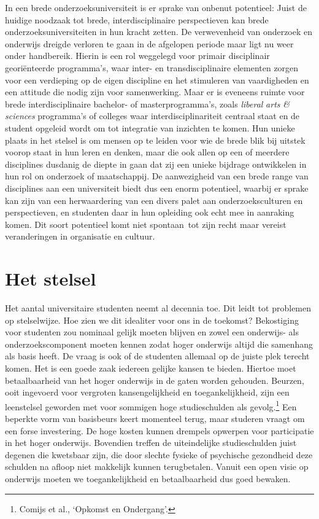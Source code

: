 \documentclass[smallauthor, chapterhaspagenum, nochapterinheader, pagenuminheader,  bigchapnum,medium2, tocpages, garamond, titleinheader]{jote-book}
\begin{document}
	In een brede onderzoeksuniversiteit is er sprake van onbenut potentieel: Juist de huidige noodzaak tot brede, interdisciplinaire perspectieven kan brede onderzoeksuniversiteiten in hun kracht zetten. De verwevenheid van onderzoek en onderwijs dreigde verloren te gaan in de afgelopen periode maar ligt nu weer onder handbereik. Hierin is een rol weggelegd voor primair disciplinair georiënteerde programma's, waar inter- en transdisciplinaire elementen zorgen voor een verdieping op de eigen discipline en het stimuleren van vaardigheden en een attitude die nodig zijn voor samenwerking. Maar er is eveneens ruimte voor brede interdisciplinaire bachelor- of masterprogramma's, zoals \emph{liberal}\emph{ arts}\emph{ \& }\emph{sciences} programma's of colleges waar interdisciplinariteit centraal staat en de student opgeleid wordt om tot integratie van inzichten te komen. Hun unieke plaats in het stelsel is om mensen op te leiden voor wie de brede blik bij uitstek voorop staat in hun leren en denken, maar die ook allen op een of meerdere disciplines dusdanig de diepte in gaan dat zij een unieke bijdrage ontwikkelen in hun rol on onderzoek of maatschappij. De aanwezigheid van een brede range van disciplines aan een universiteit biedt dus een enorm potentieel, waarbij er sprake kan zijn van een herwaardering van een divers palet aan onderzoeksculturen en perspectieven, en studenten daar in hun opleiding ook echt mee in aanraking komen. Dit soort potentieel komt niet spontaan tot zijn recht maar vereist veranderingen in organisatie en cultuur.



	\section{Het stelsel}



	Het aantal universitaire studenten neemt al decennia toe. Dit leidt tot problemen op stelselwijze. Hoe zien we dit idealiter voor ons in de toekomst? Bekostiging voor studenten zou nominaal gelijk moeten blijven en zowel een onderwijs- als onderzoekscomponent moeten kennen zodat hoger onderwijs altijd die samenhang als basis heeft. De vraag is ook of de studenten allemaal op de juiste plek terecht komen. Het is een goede zaak iedereen gelijke kansen te bieden. Hiertoe moet betaalbaarheid van het hoger onderwijs in de gaten worden gehouden. Beurzen, ooit ingevoerd voor vergroten kansengelijkheid en toegankelijkheid, zijn een leenstelsel geworden met voor sommigen hoge studieschulden als gevolg.\footnote{Comijs et al., ‘Opkomst en Ondergang'.} Een beperkte vorm van basisbeurs keert momenteel terug, maar studeren vraagt om een forse investering. De hoge kosten kunnen drempels opwerpen voor participatie in het hoger onderwijs. Bovendien treffen de uiteindelijke studieschulden juist degenen die kwetsbaar zijn, die door slechte fysieke of psychische gezondheid deze schulden na afloop niet makkelijk kunnen terugbetalen. Vanuit een open visie op onderwijs moeten we toegankelijkheid en betaalbaarheid dus goed bewaken.
\end{document}
